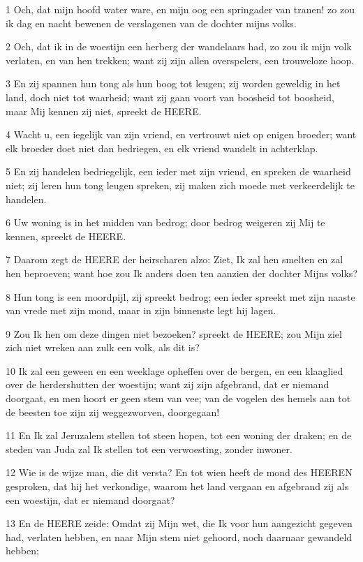 \par 1 Och, dat mijn hoofd water ware, en mijn oog een springader van tranen! zo zou ik dag en nacht bewenen de verslagenen van de dochter mijns volks.
\par 2 Och, dat ik in de woestijn een herberg der wandelaars had, zo zou ik mijn volk verlaten, en van hen trekken; want zij zijn allen overspelers, een trouweloze hoop.
\par 3 En zij spannen hun tong als hun boog tot leugen; zij worden geweldig in het land, doch niet tot waarheid; want zij gaan voort van boosheid tot boosheid, maar Mij kennen zij niet, spreekt de HEERE.
\par 4 Wacht u, een iegelijk van zijn vriend, en vertrouwt niet op enigen broeder; want elk broeder doet niet dan bedriegen, en elk vriend wandelt in achterklap.
\par 5 En zij handelen bedriegelijk, een ieder met zijn vriend, en spreken de waarheid niet; zij leren hun tong leugen spreken, zij maken zich moede met verkeerdelijk te handelen.
\par 6 Uw woning is in het midden van bedrog; door bedrog weigeren zij Mij te kennen, spreekt de HEERE.
\par 7 Daarom zegt de HEERE der heirscharen alzo: Ziet, Ik zal hen smelten en zal hen beproeven; want hoe zou Ik anders doen ten aanzien der dochter Mijns volks?
\par 8 Hun tong is een moordpijl, zij spreekt bedrog; een ieder spreekt met zijn naaste van vrede met zijn mond, maar in zijn binnenste legt hij lagen.
\par 9 Zou Ik hen om deze dingen niet bezoeken? spreekt de HEERE; zou Mijn ziel zich niet wreken aan zulk een volk, als dit is?
\par 10 Ik zal een geween en een weeklage opheffen over de bergen, en een klaaglied over de herdershutten der woestijn; want zij zijn afgebrand, dat er niemand doorgaat, en men hoort er geen stem van vee; van de vogelen des hemels aan tot de beesten toe zijn zij weggezworven, doorgegaan!
\par 11 En Ik zal Jeruzalem stellen tot steen hopen, tot een woning der draken; en de steden van Juda zal Ik stellen tot een verwoesting, zonder inwoner.
\par 12 Wie is de wijze man, die dit versta? En tot wien heeft de mond des HEEREN gesproken, dat hij het verkondige, waarom het land vergaan en afgebrand zij als een woestijn, dat er niemand doorgaat?
\par 13 En de HEERE zeide: Omdat zij Mijn wet, die Ik voor hun aangezicht gegeven had, verlaten hebben, en naar Mijn stem niet gehoord, noch daarnaar gewandeld hebben;
